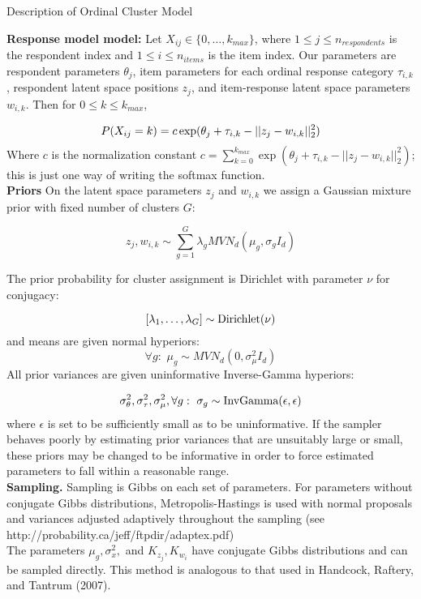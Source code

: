 \documentclass[12pt]{article}
\newcommand{\tx}[1]{\textnormal{#1}}
\begin{document}
	
	\begin{center}
		Description of Ordinal Cluster Model
	\end{center}
	
\textbf{Response model model:} Let $X_{ij}\in\{0,\dots,k_{max}\}$, where $1\leq j\leq n_{respondents}$ is the respondent index and $1\leq i\leq n_{items}$ is the item index. Our parameters are respondent parameters $\theta_j$, item parameters for each ordinal response category $\tau_{i,k}$, respondent latent space positions $z_j$, and item-response latent space parameters $w_{i,k}$.  Then for $0\leq k\leq k_{max}$,

$$P(X_{ij}=k)=c\,\tx{exp}(\theta_j+\tau_{i,k}-||{z}_j-w_{i,k}||_2^2)$$ Where $c$ is the normalization constant  $c=\sum_{k=0}^{k_{max}}\exp(\theta_j+\tau_{i,k}-||z_j-w_{i,k}||_2^2)$; this is just one way of writing the softmax function. \\


\textbf{Priors} On the latent space parameters $z_j$ and $w_{i,k}$ we assign a Gaussian mixture prior with fixed number of clusters $G$:

$$z_j,w_{i,k}\sim\sum_{g=1}^{G}\lambda_{g}MVN_d(\mu_{g},\sigma_{g}I_d)$$

The prior probability for cluster assignment is Dirichlet with parameter $\nu$ for conjugacy:

$$[\lambda_1,\dots,\lambda_G]\sim \tx{Dirichlet}(\nu)$$ and means are given normal hyperiors: $$\forall g:\,\,\mu_{g}\sim MVN_d(0,\sigma_\mu^2I_d)$$ All prior variances are given uninformative Inverse-Gamma hyperiors:\

 $$\sigma_\theta^2,\sigma_\tau^2,\sigma_\mu^2,\forall g:\,\,\sigma_{g} \sim\tx{InvGamma}(\epsilon,\epsilon)$$ where $\epsilon$ is set to be sufficiently small as to be uninformative. If the sampler behaves poorly by estimating prior variances that are unsuitably large or small, these priors may be changed to be informative in order to force estimated parameters to fall within a reasonable range.\\
 

\textbf{Sampling.} Sampling is Gibbs on each set of parameters. For parameters without conjugate Gibbs distributions, Metropolis-Hastings is used with normal proposals and variances adjusted adaptively throughout the sampling (see http://probability.ca/jeff/ftpdir/adaptex.pdf)\\


The parameters $\mu_g,\sigma_x^2,$ and $K_{z_j},K_{w_i}$ have conjugate Gibbs distributions and can be sampled directly. This method is analogous to that used in Handcock, Raftery, and Tantrum (2007).
    
\end{document}
